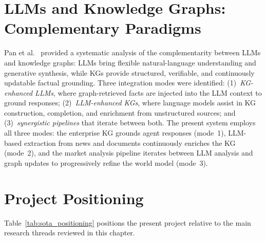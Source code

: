 \section{LLMs and Knowledge Graphs: Complementary Paradigms}

Pan et al.~\cite{pan2023llmkg} provided a systematic analysis of the
complementarity between LLMs and knowledge graphs: LLMs bring flexible
natural-language understanding and generative synthesis, while KGs provide
structured, verifiable, and continuously updatable factual grounding.
Three integration modes were identified: (1)~\textit{KG-enhanced LLMs},
where graph-retrieved facts are injected into the LLM context to ground
responses; (2)~\textit{LLM-enhanced KGs}, where language models assist in
KG construction, completion, and enrichment from unstructured sources;
and (3)~\textit{synergistic pipelines} that iterate between both. The
present system employs all three modes: the enterprise KG grounds agent
responses (mode~1), LLM-based extraction from news and documents
continuously enriches the KG (mode~2), and the market analysis pipeline
iterates between LLM analysis and graph updates to progressively refine
the world model (mode~3).

\section{Project Positioning}

Table~\ref{tab:sota_positioning} positions the present project relative to
the main research threads reviewed in this chapter.

